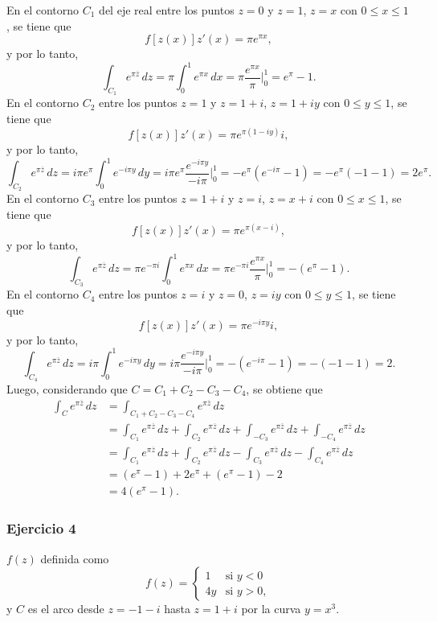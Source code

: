 \documentclass[a4paper]{report}
\begin{document}
En el contorno \(C_1\) del eje real entre los puntos \(z=0\) y \(z=1\), \(z=x\) con \(0\leq x\leq1\), se tiene que 
\[
 f[z(x)]z'(x)=\pi e^{\pi x},
\]
y por lo tanto,
\[
 \int_{C_1}e^{\pi\overline{z}}\,dz=\pi\int_0^1e^{\pi x}\,dx=\pi\frac{e^{\pi x}}{\pi}\bigg|_0^1=e^\pi-1.
\]
En el contorno \(C_2\) entre los puntos \(z=1\) y \(z=1+i\), \(z=1+iy\) con \(0\leq y\leq1\), se tiene que 
\[
 f[z(x)]z'(x)=\pi e^{\pi(1-iy)}i,
\]
y por lo tanto,
\[
 \int_{C_2}e^{\pi\overline{z}}\,dz=i\pi e^\pi\int_0^1e^{-i\pi y}\,dy=i\pi e^\pi\frac{e^{-i\pi y}}{-i\pi}\bigg|_0^1=-e^\pi(e^{-i\pi}-1)=-e^\pi(-1-1)=2e^\pi.
\]
En el contorno \(C_3\) entre los puntos \(z=1+i\) y \(z=i\), \(z=x+i\) con \(0\leq x\leq1\), se tiene que 
\[
 f[z(x)]z'(x)=\pi e^{\pi(x-i)},
\]
y por lo tanto,
\[
 \int_{C_3}e^{\pi\overline{z}}\,dz=\pi e^{-\pi i}\int_0^1e^{\pi x}\,dx=\pi e^{-\pi i}\frac{e^{\pi x}}{\pi}\bigg|_0^1=-(e^\pi-1).
\]
En el contorno \(C_4\) entre los puntos \(z=i\) y \(z=0\), \(z=iy\) con \(0\leq y\leq1\), se tiene que 
\[
 f[z(x)]z'(x)=\pi e^{-i\pi y}i,
\]
y por lo tanto,
\[
 \int_{C_4}e^{\pi\overline{z}}\,dz=i\pi\int_0^1e^{-i\pi y}\,dy=i\pi\frac{e^{-i\pi y}}{-i\pi}\bigg|_0^1=-(e^{-i\pi}-1)=-(-1-1)=2.
\]
Luego, considerando que \(C=C_1+C_2-C_3-C_4\), se obtiene que 
\begin{align*}
 \int_{C}e^{\pi\overline{z}}\,dz&=\int_{C_1+C_2-C_3-C_4}e^{\pi\overline{z}}\,dz\\
  &=\int_{C_1}e^{\pi\overline{z}}\,dz+\int_{C_2}e^{\pi\overline{z}}\,dz+\int_{-C_3}e^{\pi\overline{z}}\,dz+\int_{-C_4}e^{\pi\overline{z}}\,dz\\
  &=\int_{C_1}e^{\pi\overline{z}}\,dz+\int_{C_2}e^{\pi\overline{z}}\,dz-\int_{C_3}e^{\pi\overline{z}}\,dz-\int_{C_4}e^{\pi\overline{z}}\,dz\\
  &=(e^\pi-1)+2e^\pi+(e^\pi-1)-2\\
  &=4(e^\pi-1).
\end{align*}

\subsubsection{Ejercicio 4}

\(f(z)\) definida como
\[
 f(z)=\left\{ 
 \begin{array}{ll}
  1 & \textrm{si }y<0\\
  4y & \textrm{si }y>0,
 \end{array}
 \right.
\]
y \(C\) es el arco desde \(z=-1-i\) hasta \(z=1+i\) por la curva \(y=x^3\).
\end{document}
